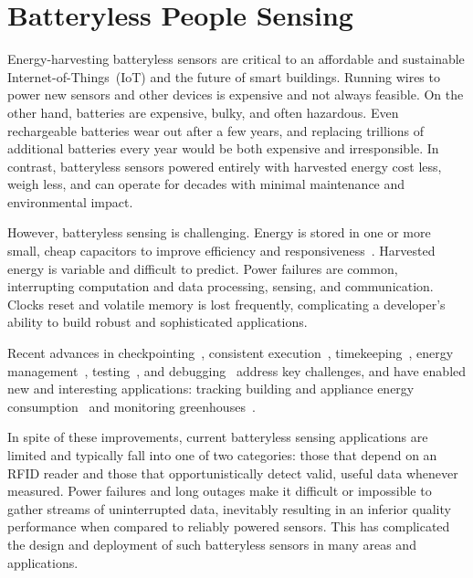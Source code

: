\section{Batteryless People Sensing}
\label{sec:background}

Energy-harvesting batteryless sensors are critical to an affordable and sustainable Internet-of-Things~(IoT) and the future of smart buildings.
%
Running wires to power new sensors and other devices is expensive and not always feasible.
On the other hand, batteries are expensive, bulky, and often hazardous.
Even rechargeable batteries wear out after a few years, and replacing trillions of additional batteries every year would be both expensive and irresponsible.
%
In contrast, batteryless sensors powered entirely with harvested energy cost less, weigh less, and can operate for decades with minimal maintenance and environmental impact.

However, batteryless sensing is challenging.
Energy is stored in one or more small, cheap capacitors to improve efficiency and responsiveness~\cite{jhester:ufop:sensys}.
Harvested energy is variable and difficult to predict.
Power failures are common, interrupting computation and data processing, sensing, and communication.
Clocks reset and volatile memory is lost frequently, complicating a developer's ability to build robust and sophisticated applications.

Recent advances in checkpointing~\cite{ransford2011mementos, balsamo2015hibernus}, consistent execution~\cite{colin2016chain, Lucia:2015:Dino}, timekeeping~\cite{hester2016persistent}, energy management~\cite{jhester:ufop:sensys}, testing~\cite{ekho-sensys}, and debugging~\cite{colin_edb} address key challenges, and have enabled new and interesting applications:  tracking building and appliance energy consumption~\cite{debruin2013monjolo,campbell2014energy} and monitoring greenhouses~\cite{jhester:ufop:sensys}.


In spite of these improvements, current batteryless sensing applications are limited and typically fall into one of two categories: those that depend on an RFID reader and those that opportunistically detect valid, useful data whenever measured.
Power failures and long outages make it difficult or impossible to gather streams of uninterrupted data, inevitably resulting in an inferior quality performance when compared to reliably powered sensors.
This has complicated the design and deployment of such batteryless sensors in many areas and applications.

